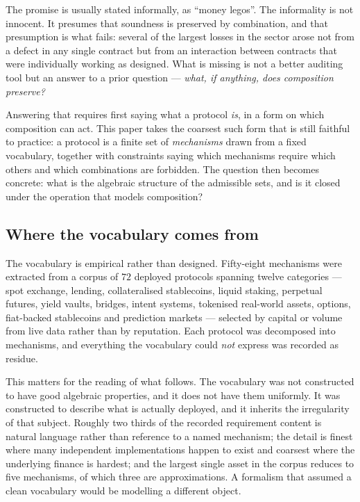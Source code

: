 \documentclass[11pt]{article}
\theoremstyle{definition}
\theoremstyle{plain}
\theoremstyle{remark}
\begin{document}
The promise is usually stated informally, as ``money legos''. The informality is
not innocent. It presumes that soundness is preserved by combination, and that
presumption is what fails: several of the largest losses in the sector arose not
from a defect in any single contract but from an interaction between contracts
that were individually working as designed. What is missing is not a better
auditing tool but an answer to a prior question --- \emph{what, if anything, does
composition preserve?}

Answering that requires first saying what a protocol \emph{is}, in a form on
which composition can act. This paper takes the coarsest such form that is still
faithful to practice: a protocol is a finite set of \emph{mechanisms} drawn from
a fixed vocabulary, together with constraints saying which mechanisms require
which others and which combinations are forbidden. The question then becomes
concrete: what is the algebraic structure of the admissible sets, and is it
closed under the operation that models composition?

\subsection{Where the vocabulary comes from}

The vocabulary is empirical rather than designed. Fifty-eight mechanisms were
extracted from a corpus of $72$ deployed protocols spanning twelve categories ---
spot exchange, lending, collateralised stablecoins, liquid staking, perpetual
futures, yield vaults, bridges, intent systems, tokenised real-world assets,
options, fiat-backed stablecoins and prediction markets --- selected by capital
or volume from live data rather than by reputation. Each protocol was decomposed
into mechanisms, and everything the vocabulary could \emph{not} express was
recorded as residue.

This matters for the reading of what follows. The vocabulary was not constructed
to have good algebraic properties, and it does not have them uniformly. It was
constructed to describe what is actually deployed, and it inherits the
irregularity of that subject. Roughly two thirds of the recorded requirement
content is natural language rather than reference to a named mechanism; the
detail is finest where many independent implementations happen to exist and
coarsest where the underlying finance is hardest; and the largest single asset in
the corpus reduces to five mechanisms, of which three are approximations. A
formalism that assumed a clean vocabulary would be modelling a different object.
\end{document}
